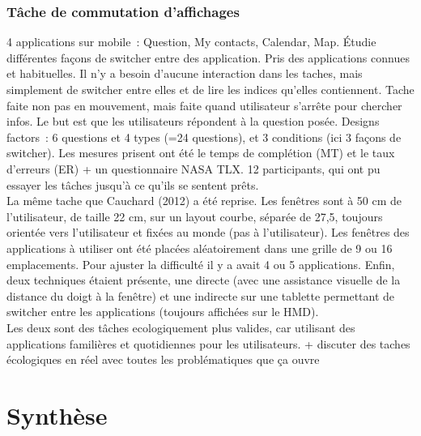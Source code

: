\subsubsection*{Tâche de commutation d'affichages}
4 applications sur mobile~: Question, My contacts, Calendar, Map. Étudie différentes façons de switcher entre des application. Pris des applications connues et habituelles. Il n'y a besoin d'aucune interaction dans les taches, mais simplement de switcher entre elles et de lire les indices qu'elles contiennent. Tache faite non pas en mouvement, mais faite quand utilisateur s'arrête pour chercher infos. Le but est que les utilisateurs répondent à la question posée. Designs factors~: 6 questions et 4 types (=24 questions), et 3 conditions (ici 3 façons de switcher). Les mesures prisent ont été le temps de complétion (MT) et le taux d'erreurs (ER) + un questionnaire NASA TLX. 12 participants, qui ont pu essayer les tâches jusqu'à ce qu'ils se sentent prêts. \cite{CauchardLoechtefeldFraserEtAl2012} \\
La même tache que Cauchard (2012) a été reprise. Les fenêtres sont à 50 cm de l'utilisateur, de taille 22 cm, sur un layout courbe, séparée de 27,5\textdegree, toujours orientée vers l'utilisateur et fixées au monde (pas à l'utilisateur). Les fenêtres des applications à utiliser ont été placées aléatoirement dans une grille de 9 ou 16 emplacements. Pour ajuster la difficulté il y a avait 4 ou 5 applications. Enfin, deux techniques étaient présente, une directe (avec une assistance visuelle de la distance du doigt à la fenêtre) et une indirecte sur une tablette permettant de switcher entre les applications (toujours affichées sur le HMD). \cite{EnsFinneganIrani2014} \\
Les deux sont des tâches ecologiquement plus valides, car utilisant des applications familières et quotidiennes pour les utilisateurs. + discuter  des taches écologiques en réel avec toutes les problématiques que ça ouvre \cite{KoelleKranzMoeller2015} \cite{DenningDehlawiKohno2014}



\section*{Synthèse}
